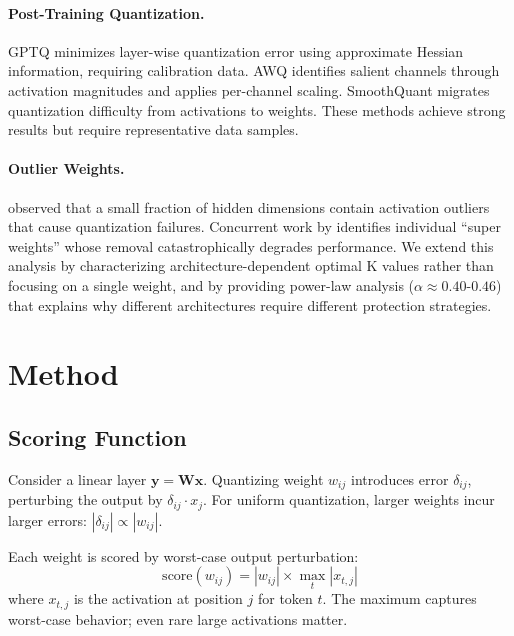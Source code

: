 \documentclass{article}
\begin{document}
\paragraph{Post-Training Quantization.} GPTQ \citep{frantar2022gptq} minimizes layer-wise quantization error using approximate Hessian information, requiring calibration data. AWQ \citep{lin2024awq} identifies salient channels through activation magnitudes and applies per-channel scaling. SmoothQuant \citep{xiao2023smoothquant} migrates quantization difficulty from activations to weights. These methods achieve strong results but require representative data samples.

\paragraph{Outlier Weights.} \citet{dettmers2022llmint8} observed that a small fraction of hidden dimensions contain activation outliers that cause quantization failures. Concurrent work by \citet{yu2024superweight} identifies individual ``super weights'' whose removal catastrophically degrades performance. We extend this analysis by characterizing architecture-dependent optimal K values rather than focusing on a single weight, and by providing power-law analysis ($\alpha \approx 0.40$-$0.46$) that explains why different architectures require different protection strategies.

\section{Method}

\subsection{Scoring Function}

Consider a linear layer $\mathbf{y} = \mathbf{W}\mathbf{x}$. Quantizing weight $w_{ij}$ introduces error $\delta_{ij}$, perturbing the output by $\delta_{ij} \cdot x_j$. For uniform quantization, larger weights incur larger errors: $|\delta_{ij}| \propto |w_{ij}|$.

Each weight is scored by worst-case output perturbation:
\begin{equation}
\text{score}(w_{ij}) = |w_{ij}| \times \max_t |x_{t,j}|
\end{equation}
where $x_{t,j}$ is the activation at position $j$ for token $t$. The maximum captures worst-case behavior; even rare large activations matter.
\end{document}
